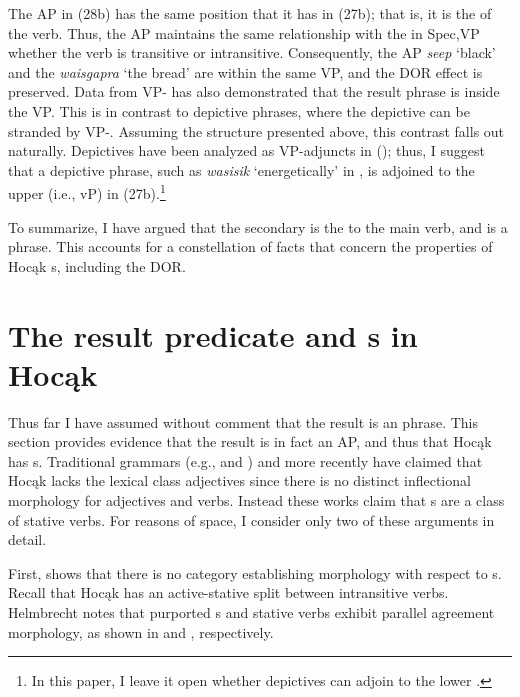 \documentclass[output=paper]{LSP/langsci}
\begin{document}
The AP in (28b) has the same position that it has in (27b); that is, it is the  of the verb. Thus, the AP maintains the same relationship with the  in Spec,VP whether the verb is transitive or intransitive. Consequently, the AP \textit{seep} `black' and the  \textit{waisgapra} `the bread' are within the same VP, and the DOR effect is preserved. Data from VP- has also demonstrated that the result phrase is inside the VP. This is in contrast to depictive phrases, where the depictive can be stranded by VP-. Assuming the structure presented above, this contrast falls out naturally. Depictives have been analyzed as VP-adjuncts in  (\citealt{LevinRappaportHovav1995}); thus, I suggest that a depictive phrase, such as \textit{wasisik} `energetically' in , is adjoined to the upper  (i.e., vP) in (27b).\footnote{In this paper, I leave it open whether depictives can adjoin to the lower .}

To summarize, I have argued that the  secondary  is the  to the main verb, and is a phrase. This accounts for a constellation of facts that concern the properties of Hocąk s, including the DOR.

\section{The result predicate and s in Hocąk} \label{sec:rosen:5}

Thus far I have assumed without comment that the result  is an  phrase. This section provides evidence that the result is in fact an AP, and thus that Hocąk has s. Traditional grammars (e.g., \citealt{Lipkind1945} and \citealt{Susman1943}) and more recently \citet{Helmbrecht2006b} have claimed that Hocąk lacks the lexical class adjectives since there is no distinct inflectional morphology for adjectives and verbs. Instead these works claim that s are a class of stative verbs. For reasons of space, I consider only two of these arguments in detail.

First, \citet{Helmbrecht2006b} shows that there is no category establishing morphology with respect to s. Recall that Hocąk has an active-stative split between intransitive verbs. Helmbrecht notes that purported s and stative verbs exhibit parallel agreement morphology, as shown in  and , respectively.
\end{document}
